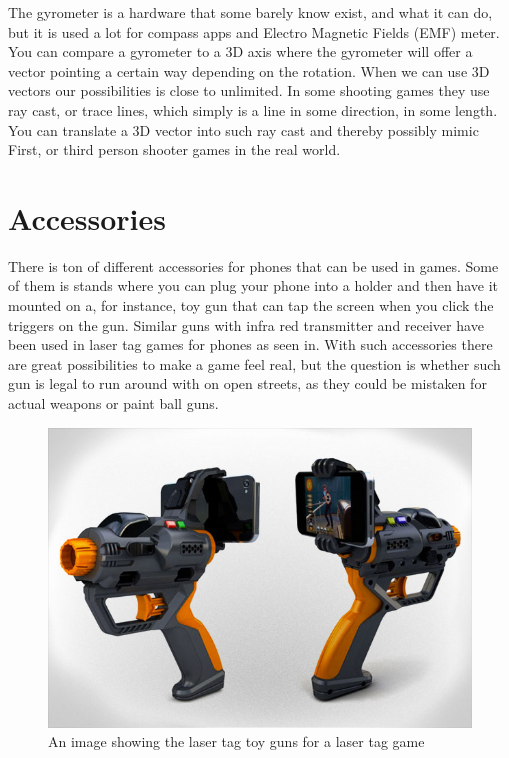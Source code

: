 The gyrometer is a hardware that some barely know exist, and what it can do, but it is used a lot for compass apps and Electro Magnetic Fields (EMF) meter. You can compare a gyrometer to a 3D axis where the gyrometer will offer a vector pointing a certain way depending on the rotation\cite{GyroMeter}. When we can use 3D vectors our possibilities is close to unlimited. In some shooting games they use ray cast, or trace lines, which simply is a line in some direction, in some length. You can translate a 3D vector into such ray cast and thereby possibly mimic First, or third person shooter games in the real world.


\section{Accessories}
\label{cha:Accessories}
There is ton of different accessories for phones that can be used in games. Some of them is stands where you can plug your phone into a holder and then have it mounted on a, for instance, toy gun that can tap the screen when you click the triggers on the gun\cite{LaserTag}. Similar guns with infra red transmitter and receiver have been used in laser tag games for phones as seen in. With such accessories there are great possibilities to make a game feel real, but the question is whether such gun is legal to run around with on open streets, as they could be mistaken for actual weapons or paint ball guns.

\begin{figure}[H]
\includegraphics[width=0.5\linewidth]{img/LaserTag}
\centering
\caption{An image showing the laser tag toy guns for a laser tag game}
\label{fig:LaserTag}
\end{figure}